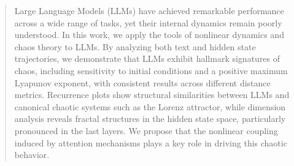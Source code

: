 \documentclass[a4paper,12pt]{article}
\begin{document}





\begin{abstract}
    Large Language Models (LLMs) have achieved remarkable performance across a wide range of tasks, yet their internal dynamics remain poorly understood. In this work, we apply the tools of nonlinear dynamics and chaos theory to LLMs. By analyzing both text and hidden state trajectories, we demonstrate that LLMs exhibit hallmark signatures of chaos, including sensitivity to initial conditions and a positive maximum Lyapunov exponent, with consistent results across different distance metrics. Recurrence plots show structural similarities between LLMs and canonical chaotic systems such as the Lorenz attractor, while dimension analysis reveals fractal structures in the hidden state space, particularly pronounced in the last layers. We propose that the nonlinear coupling induced by attention mechanisms plays a key role in driving this chaotic behavior. 
\end{abstract}
\newpage
{
  \hypersetup{linkcolor=black}
  \tableofcontents
}
\newpage
\end{document}
